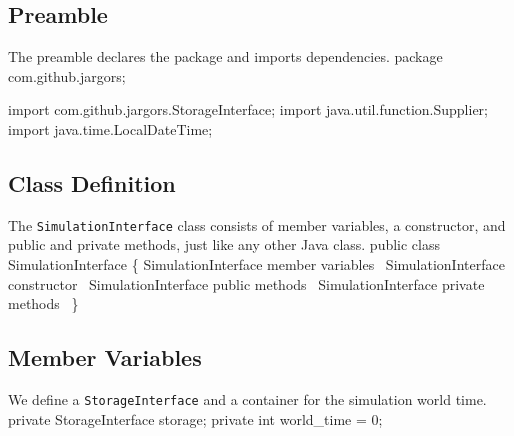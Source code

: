 \documentclass{article}
\def\nwendcode{\endtrivlist \endgroup}
\let\nwdocspar=\par
\begin{document}
\subsection{Preamble}
\label{sec:preamble}
The preamble declares the package and imports dependencies.
\nwenddocs{}\endmoddef{}
package com.github.jargors;
\nwendcode{}\nwdocspar
\nwenddocs{}\plusendmoddef
import com.github.jargors.StorageInterface;
import java.util.function.Supplier;
import java.time.LocalDateTime;
\nwendcode{}\nwdocspar

\subsection{Class Definition}
\label{sec:class-definition}
The {\tt{}SimulationInterface} class consists of member variables, a constructor, and public
and private methods, just like any other Java class.
\nwenddocs{}\endmoddef{}
public class SimulationInterface \{
  \LA{}\code{}SimulationInterface\edoc{} member variables~{\nwtagstyle{}}\RA{}
  \LA{}\code{}SimulationInterface\edoc{} constructor~{\nwtagstyle{}}\RA{}
  \LA{}\code{}SimulationInterface\edoc{} public methods~{\nwtagstyle{}}\RA{}
  \LA{}\code{}SimulationInterface\edoc{} private methods~{\nwtagstyle{}}\RA{}
\}
\nwendcode{}\nwdocspar

\subsection{Member Variables}
\label{sec:member-variables}
We define a {\tt{}StorageInterface} and a container for the simulation world time.
\nwenddocs{}\endmoddef{}
private StorageInterface storage;
private int world_time = 0;
\eatline
{}\nwendcode{}\nwdocspar
\end{document}
